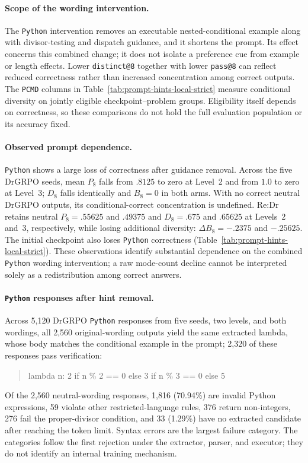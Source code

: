 \documentclass{article}
\newcommand{\1}{\mathbf 1}
\newcommand{\pmd}{\texttt{PCMD}}
\theoremstyle{remark}
\theoremstyle{definition}
\theoremstyle{plain}
\begin{document}


\paragraph{Scope of the wording intervention.}
The \texttt{Python} intervention removes an executable nested-conditional example
along with divisor-testing and dispatch guidance, and it shortens the prompt.
Its effect concerns this combined change; it does not isolate a preference
cue from example or length effects. Lower \texttt{distinct@8} together with
lower \texttt{pass@8} can reflect reduced correctness rather than increased
concentration among correct outputs. The \pmd{} columns in
Table~\ref{tab:prompt-hints-local-strict} measure conditional diversity on
jointly eligible checkpoint--problem groups. Eligibility itself depends on
correctness, so these comparisons do not hold the full evaluation population
or its accuracy fixed.

\paragraph{Observed prompt dependence.}
\texttt{Python} shows a large loss of correctness after guidance removal. Across the
five DrGRPO seeds, mean $P_8$ falls from $.8125$ to zero at Level~2 and from
$1.0$ to zero at Level~3; $D_8$ falls identically and $B_8=0$ in both arms.
With no correct neutral DrGRPO outputs, its conditional-correct concentration
is undefined. Re:Dr retains neutral $P_8=.55625$ and $.49375$ and
$D_8=.675$ and $.65625$ at Levels~2 and~3, respectively, while losing
additional diversity: $\Delta B_8=-.2375$ and $-.25625$. The initial checkpoint
also loses \texttt{Python} correctness (Table~\ref{tab:prompt-hints-local-strict}).
These observations identify substantial dependence on the combined \texttt{Python}
wording intervention; a raw mode-count decline cannot be interpreted solely
as a redistribution among correct answers.


\paragraph{\texttt{Python} responses after hint removal.}
Across 5,120 DrGRPO \texttt{Python} responses from five seeds, two levels, and both
wordings, all 2,560 original-wording outputs yield the same extracted lambda,
whose body matches the conditional example in the prompt; 2,320 of these
responses pass verification:
\begin{quote}\footnotesize\ttfamily
lambda n: 2 if n \% 2 == 0 else 3 if n \% 3 == 0 else 5
\end{quote}
Of the 2,560 neutral-wording responses, 1,816 (70.94\%) are invalid Python
expressions, 59 violate other restricted-language rules, 376 return
non-integers, 276 fail the proper-divisor condition, and 33 (1.29\%) have
no extracted candidate after reaching the token limit. Syntax errors are
the largest failure category. The categories follow the first rejection
under the extractor, parser, and executor; they do not identify an internal
training mechanism.
\end{document}
